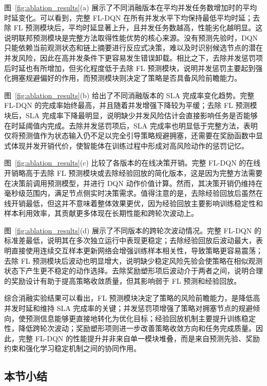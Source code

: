 图~\ref{fig:ablation_results}(a) 展示了不同消融版本在平均并发任务数增加时的平均时延变化。可以看到，完整 FL-DQN 在所有并发水平下均保持最低平均时延；去除 FL 预测模块后，平均时延显著上升，且并发任务数越高，性能劣化越明显。这说明联邦预测模块是完整方法取得性能优势的核心来源。没有预测先验时，DQN 只能依赖当前观测状态和链上摘要进行反应式决策，难以及时识别候选节点的潜在并发风险，因此在高并发条件下更容易发生错误卸载。相比之下，去除并发惩罚项后时延也有所增加，但劣化程度低于去除 FL 预测模块，说明并发惩罚主要起到强化拥塞规避偏好的作用，而预测模块则决定了策略是否具备风险前瞻能力。

图~\ref{fig:ablation_results}(b) 给出了不同消融版本的 SLA 完成率变化趋势。完整 FL-DQN 的完成率始终最高，并且随着并发增强下降较为平缓；去除 FL 预测模块后，SLA 完成率下降最明显，说明缺少并发风险估计会直接影响任务是否能够在时延阈值内完成。去除并发惩罚项后，SLA 完成率也明显低于完整方法，表明仅将预测值作为状态输入仍不足以完全引导策略规避拥塞，还需要在奖励函数中显式体现并发开销代价，使智能体在训练过程中形成对高风险动作的惩罚记忆。

图~\ref{fig:ablation_results}(c) 比较了各版本的在线决策开销。完整 FL-DQN 的在线开销略高于去除 FL 预测模块或去除经验回放的简化版本，这是因为完整方法需要在决策前调用预测模型，并进行 DQN 动作价值计算。然而，其决策开销仍维持在毫秒级范围内，满足节点侧实时决策需求。值得注意的是，去除经验回放后虽然在线开销最低，但这并不意味着整体效果更优，因为经验回放主要影响训练稳定性和样本利用效率，其贡献更多体现在长期性能和跨轮次波动上。

图~\ref{fig:ablation_results}(d) 展示了不同版本的跨轮次波动情况。完整 FL-DQN 的标准差最低，说明其在多次独立运行中表现更稳定；去除经验回放后波动最大，表明直接使用连续交互样本更新网络会增强训练样本相关性，导致策略更容易震荡；去除 FL 预测模块后波动也明显增大，说明缺少稳定风险先验会使策略在相似观测状态下产生更不稳定的动作选择。去除奖励塑形项后波动介于两者之间，说明合理的奖励设计有助于提高策略收敛质量，但其影响弱于 FL 预测和经验回放。

综合消融实验结果可以看出，FL 预测模块决定了策略的风险前瞻能力，是降低高并发时延和维持 SLA 完成率的关键；并发惩罚项增强了策略对拥塞节点的规避倾向，使预测信息能够更直接地转化为优化目标；经验回放机制主要提升训练稳定性，降低跨轮次波动；奖励塑形项则进一步改善策略收敛方向和任务完成质量。因此，完整 FL-DQN 的性能提升并非来自单一模块堆叠，而是来自预测先验、奖励约束和强化学习稳定机制之间的协同作用。

\subsection{本节小结}
\label{subsec:exp_summary}

